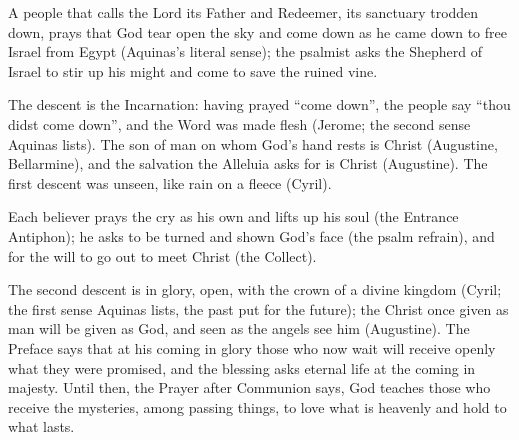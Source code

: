\begin{fourSenses}
\item[Literal.] A people that calls the Lord its Father and Redeemer, its
sanctuary trodden down, prays that God tear open the sky and come down as he
came down to free Israel from Egypt (Aquinas's literal sense); the psalmist
asks the Shepherd of Israel to stir up his might and come to save the ruined
vine.
\item[Allegorical.] The descent is the Incarnation: having prayed ``come
down'', the people say ``thou didst come down'', and the Word was made flesh
(Jerome; the second sense Aquinas lists). The son of man on whom God's hand rests is
Christ (Augustine, Bellarmine), and the salvation the Alleluia asks for is
Christ (Augustine). The first descent was unseen, like rain on a fleece
(Cyril).
\item[Moral.] Each believer prays the cry as his own and lifts up his soul
(the Entrance Antiphon); he asks to be turned and shown God's face (the psalm
refrain), and for the will to go out to meet Christ (the Collect).
\item[Anagogical.] The second descent is in glory, open, with the crown of a
divine kingdom (Cyril; the first sense Aquinas lists, the past put for the
future); the Christ once given as man will be given as God, and seen as the
angels see him (Augustine). The Preface says that at his coming in glory
those who now wait will receive openly what they were promised, and the
blessing asks eternal life at the coming in majesty. Until then, the Prayer after
Communion says, God teaches those who receive the mysteries, among passing
things, to love what is heavenly and hold to what lasts.
\end{fourSenses}
